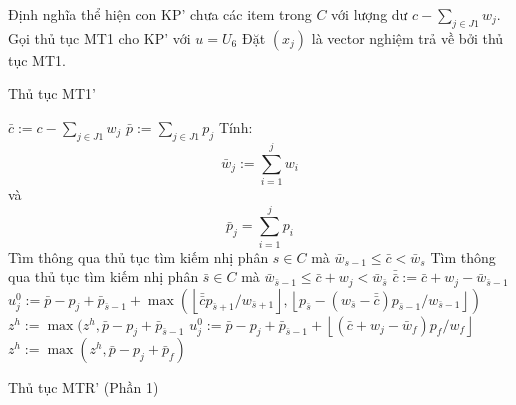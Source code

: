 \begin{algorithm}[H]
    \DontPrintSemicolon
    \vspace{1em}
    \vspace{1em}
    Định nghĩa thể hiện con KP' chưa các item trong $C$ với lượng dư $c - \sum_{j \in J1}w_j$.\;
    \Else
    {
        Gọi thủ tục MT1 cho KP' với $u = U_6$\;
    }
    Đặt $(\hat{x}_j)$ là vector nghiệm trả về bởi thủ tục MT1.
    \caption{Thủ tục MT1'}
    \label{algo:mt1_prime}
\end{algorithm}



\begin{algorithm}[H]
    \DontPrintSemicolon
    \vspace{1em}
    \vspace{1em}

    $\bar{c}:= c - \sum_{j \in J1}w_j$\;
    $\bar{p}:= \sum_{j \in J1}p_j$\;
    {
        Tính:
        \begin{equation}
            \bar{w}_j := \sum_{i = 1}^jw_i
        \end{equation}
        và
        \begin{equation}
            \bar{p}_j = \sum_{i = 1}^jp_i
        \end{equation}\;
    }
    Tìm thông qua thủ tục tìm kiếm nhị phân $s \in C$ mà $\bar{w}_{s - 1} \leq \bar{c} < \bar{w}_s$\;
    {
        {
            Tìm thông qua thủ tục tìm kiếm nhị phân $\bar{s} \in C$ mà $\bar{w}_{\bar{s} - 1} \leq \bar{c} + w_j < \bar{w}_{\bar{s}}$\;
            $\bar{\bar{c}} := \bar{c} + w_j - \bar{w}_{\bar{s} - 1}$\;
            $u^0_j := \bar{p} - p_j + \bar{p}_{\bar{s} - 1} + \max(\left \lfloor \bar{\bar{c}}p_{\bar{s}+1}/w_{\bar{s} + 1}\right \rfloor, \left \lfloor p_{\bar{s}} - (w_{\bar{s}} - \bar{\bar{c}})p_{\bar{s}-1} / w_{\bar{s} - 1}\right \rfloor)$\;
            $z^h := \max(z^h, \bar{p} - p_j + \bar{p}_{\bar{s} - 1}$\;
        }
        \Else
        {
            $u^0_j := \bar{p} - p_j + \bar{p}_{\bar{s} - 1} + \left \lfloor (\bar{c} + w_j - \bar{w}_f)p_f / w_f\right \rfloor$\;
            $z^h := \max(z^h, \bar{p} - p_j + \bar{p}_f)$\;
        }
    }   
    \caption{Thủ tục MTR' (Phần 1)}
    \label{algo:mtr_prime_part1}
\end{algorithm}


